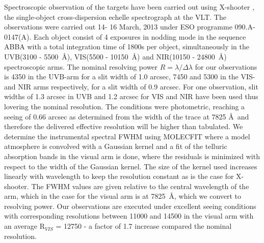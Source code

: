 \documentclass{aa}    %
\newcommand{\figref}[1]{\ref{fig:#1}}
\newcommand{\Fig}[1]{\figurename~\figref{#1}}
\newcommand{\fig}[1]{\Fig{#1}}
\newcommand{\figlabel}[1]{\label{fig:#1}}
\begin{document}
Spectroscopic observation of the targets have been carried out using X-shooter \citep{Vernet2011}, the single-object cross-dispersion echelle spectrograph at the VLT. The observations were carried out 14- 16 March, 2013 under ESO programme 090.A-0147(A). Each object consist of 4 exposures in nodding mode in the sequence ABBA with a total integration time of 1800s per object, simultaneously in the UVB(3100 - 5500~\AA), VIS(5500 - 10150~\AA)  and NIR(10150 - 24800~\AA) spectroscopic arms. The nominal resolving power $R = \lambda / \Delta \lambda$ for our observations is 4350 in the UVB-arm for a slit width of 1.0 arcsec, 7450 and 5300 in the VIS- and NIR arms respectively, for a slit width of 0.9 arcsec. For one observation, slit widths of 1.3 arcsec in UVB and 1.2 arcsec for VIS and NIR have been used thus lovering the nominal resolution. The conditions were photometric, reaching a seeing of 0.66 arcsec as determined from the width of the trace at 7825 \AA~and therefore the delivered effective resolution will be higher than tabulated. We determine the instrumental spectral FWHM using MOLECFIT \citep{Smette2015, Kausch2015} where a model atmosphere is convolved with a Gaussian kernel and a fit of the telluric absorption bands in the visual arm is done, where the residuals is minimized with respect to the width of the Gaussian kernel. The size of the kernel used increases linearly with wavelength to keep the resolution constant as is the case for X-shooter. The FWHM values are given relative to the central wavelength of the arm, which in the case for the visual arm is at 7825~\AA, which we convert to resolving power.
Our observations are executed under excellent seeing conditions with corresponding resolutions between 11000 and 14500 in the visual arm with an average R$_{VIS}$ = 12750 - a factor of 1.7 increase compared the nominal resolution. 
\end{document}
